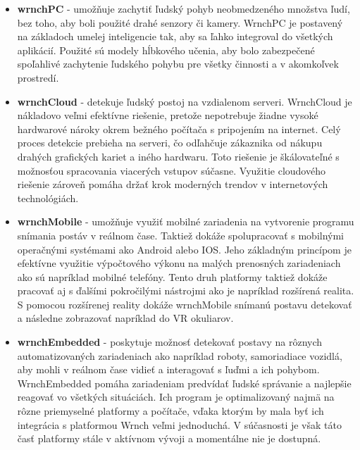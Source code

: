 \documentclass[slovak,master,dept460,male,cpp,cpdeclaration]{diploma}
\begin{document}
\begin{itemize}
\item \textbf{wrnchPC} - umožňuje zachytiť ľudský pohyb neobmedzeného množstva ľudí, bez toho, aby boli použité drahé senzory či kamery. WrnchPC je postavený na základoch  umelej inteligencie tak, aby sa ľahko integroval do všetkých aplikácií. Použité sú modely hĺbkového učenia, aby bolo zabezpečené spoľahlivé zachytenie ľudského pohybu pre všetky činnosti a v akomkoľvek prostredí.


\item \textbf{wrnchCloud} - detekuje ľudský postoj na vzdialenom serveri. WrnchCloud je nákladovo veľmi efektívne riešenie, pretože nepotrebuje žiadne vysoké hardwarové nároky okrem bežného počítača s pripojením na internet. Celý proces detekcie prebieha na serveri, čo odľahčuje zákaznika od nákupu drahých grafických kariet a iného hardwaru. Toto riešenie je škálovateľné s možnosťou spracovania viacerých vstupov súčasne. Využitie cloudového riešenie zároveň pomáha držať krok moderných trendov v internetových technológiách.

\item \textbf{wrnchMobile } - umožňuje využiť mobilné zariadenia na vytvorenie programu snímania postáv v reálnom čase. Taktiež dokáže spolupracovať s mobilnými operačnými systémami ako Android alebo IOS. Jeho základným princípom je efektívne využitie výpočtového výkonu  na malých prenosných zariadeniach ako sú napríklad mobilné telefóny. Tento druh platformy taktiež dokáže pracovať aj s ďalšími pokročilými nástrojmi ako je napríklad rozšírená realita. S pomocou rozšírenej reality dokáže wrnchMobile snímanú postavu detekovať a následne zobrazovať napríklad do VR okuliarov.


\item \textbf{wrnchEmbedded} - poskytuje možnosť detekovať postavy na rôznych automatizovaných zariadeniach ako napríklad roboty, samoriadiace vozidlá, aby mohli v reálnom čase vidieť a interagovať s ľuďmi a ich pohybom. WrnchEmbedded pomáha zariadeniam predvídať ľudské správanie a najlepšie reagovať vo všetkých situáciách. Ich program je optimalizovaný najmä na rôzne priemyselné platformy a počítače, vďaka ktorým by mala byť ich integrácia s platformou Wrnch veľmi jednoduchá. V súčasnosti je však táto časť platformy stále v aktívnom vývoji a momentálne nie je dostupná. 
\end{itemize}
\end{document}
